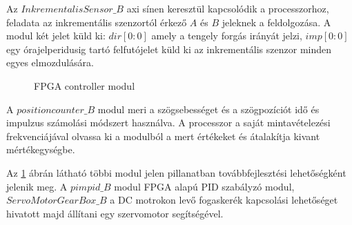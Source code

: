 Az $InkrementalisSensor\_B$ axi sínen keresztül kapcsolódik a processzorhoz, feladata az inkrementális szenzortól érkező $A$ és $B$ jeleknek a feldolgozása. A modul két jelet küld ki: $dir[0:0]$ amely a tengely forgás irányát jelzi, $imp[0:0]$ egy órajelperidusig tartó felfutójelet küld ki az inkrementális szenzor minden egyes elmozdulására.
\begin{figure}[H]
  \caption{FPGA controller modul}
  \label{fig:ControllerMag}
\end{figure}

A $positioncounter\_B$ modul meri a szögsebességet és a szögpozíciót idő és impulzus számolási módszert használva. A processzor a saját mintavételezési frekvenciájával olvassa ki a modulból a mert értékeket és átalakítja kivant mértékegységbe.

Az \ref{fig:ControllerMag} ábrán látható többi modul jelen pillanatban továbbfejlesztési lehetőségként jelenik meg. A $pimpid\_B$ modul FPGA alapú PID szabályzó modul, $ServoMotorGearBox\_B$ a DC motrokon levő fogaskerék kapcsolási lehetőséget hivatott majd állítani egy szervomotor segítségével.

